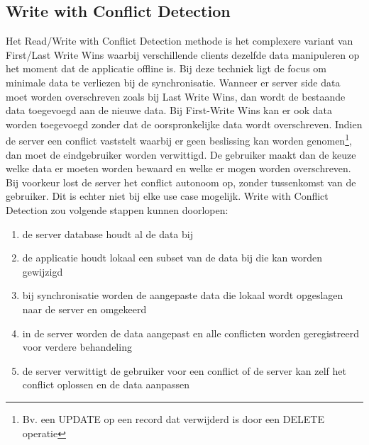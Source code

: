 \subsection{Write with Conflict Detection}
\label{subsec: conflict-detection}
Het Read/Write with Conflict Detection methode is het complexere variant van First/Last Write Wins waarbij verschillende clients dezelfde data manipuleren op het moment dat de applicatie offline is. Bij deze techniek ligt de focus om minimale data te verliezen bij de synchronisatie. Wanneer er server side data moet worden overschreven zoals bij Last Write Wins, dan wordt de bestaande data toegevoegd aan de nieuwe data. Bij First-Write Wins kan er ook data worden toegevoegd zonder dat de oorspronkelijke data wordt overschreven. Indien de server een conflict vaststelt waarbij er geen beslissing kan worden genomen\footnote{Bv. een UPDATE op een record dat verwijderd is door een DELETE operatie}, dan moet de eindgebruiker worden verwittigd. De gebruiker maakt dan de keuze welke data er moeten worden bewaard en welke er mogen worden overschreven. Bij voorkeur lost de server het conflict autonoom op, zonder tussenkomst van de gebruiker. Dit is echter niet bij elke use case mogelijk. 
Write with Conflict Detection zou volgende stappen kunnen doorlopen: 
\begin{enumerate}
\item de server database houdt al de data bij
\item de applicatie houdt lokaal een subset van de data bij die kan worden gewijzigd
\item bij synchronisatie worden de aangepaste data die lokaal wordt opgeslagen naar de server en omgekeerd
\item in de server worden de data aangepast en alle conflicten worden geregistreerd voor verdere behandeling
\item de server verwittigt de gebruiker voor een conflict of de server kan zelf het conflict oplossen en de data aanpassen
\end{enumerate}